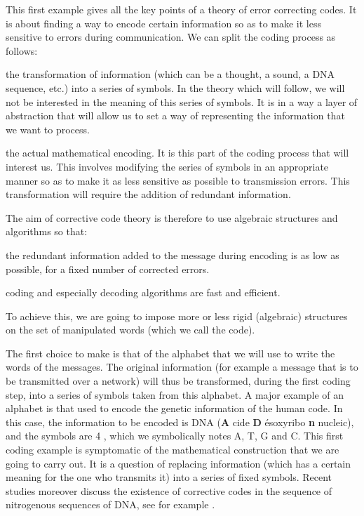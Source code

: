  
This first example gives all the key points of a theory of error correcting codes. It is about finding a way to encode certain information so as to make it less sensitive to errors during communication. We can split the coding process as follows: \begin{rs}
\item the transformation of information (which can be a thought, a sound, a DNA sequence, etc.) into a series of symbols. In the theory which will follow, we will not be interested in the meaning of this series of symbols. It is in a way a layer of abstraction that will allow us to set a way of representing the information that we want to process.
\item the actual mathematical encoding. It is this part of the coding process that will interest us. This involves modifying the series of symbols in an appropriate manner so as to make it as less sensitive as possible to transmission errors. This transformation will require the addition of redundant information.
\end{rs} The aim of corrective code theory is therefore to use algebraic structures and algorithms so that: \begin{rs}
\item the redundant information added to the message during encoding is as low as possible, for a fixed number of corrected errors.
\item coding and especially decoding algorithms are fast and efficient.
\end{rs} To achieve this, we are going to impose more or less rigid (algebraic) structures on the set of manipulated words (which we call the code).
 
 
 The first choice to make is that of the alphabet that we will use to write the words of the messages. The original information (for example a message that is to be transmitted over a network) will thus be transformed, during the first coding step, into a series of symbols taken from this alphabet. A major example of an alphabet is that used to encode the genetic information of the human code. In this case, the information to be encoded is DNA (\textbf{A} cide \textbf{D} ésoxyribo \textbf{n} nucleic), and the symbols are 4 , which we symbolically notes A, T, G and C. This first coding example is symptomatic of the mathematical construction that we are going to carry out. It is a question of replacing information (which has a certain meaning for the one who transmits it) into a series of fixed symbols. Recent studies moreover discuss the existence of corrective codes in the sequence of nitrogenous sequences of DNA, see for example \cite{liebovitch}.
 
